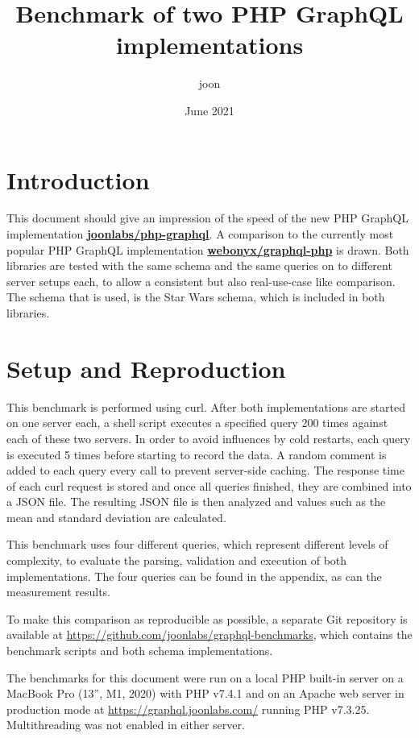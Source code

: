 \documentclass[11pt, a4paper]{article}
\title{Benchmark of two PHP GraphQL implementations }
\author{joon}
\date{June 2021}
\begin{document}
\maketitle

\section{Introduction}
This document should give an impression of the speed of the new PHP GraphQL implementation \textbf{\hyperlink{https://github.com/joonlabs/php-graphql}{joonlabs/php-graphql}}. A comparison to the currently most popular PHP GraphQL implementation \textbf{\hyperlink{https://github.com/webonyx/graphql-php}{webonyx/graphql-php}} is drawn. Both libraries are tested with the same schema and the same queries on to different server setups each, to allow a consistent but also real-use-case like comparison. The schema that is used, is the Star Wars schema, which is included in both libraries.

\section{Setup and Reproduction}
This benchmark is performed using curl. After both implementations are started on one server each, a shell script executes a specified query 200 times against each of these two servers. In order to avoid influences by cold restarts, each query is executed 5 times before starting to record the data. A random comment is added to each query every call to prevent server-side caching. The response time of each curl request is stored and once all queries finished, they are combined into a JSON file.  The resulting JSON file is then analyzed and values such as the mean and standard deviation are calculated.

This benchmark uses four different queries, which represent different levels of complexity, to evaluate the parsing, validation and execution of both implementations. The four queries can be found in the appendix, as can the measurement results. 

To make this comparison as reproducible as possible, a separate Git repository is available at \url{https://github.com/joonlabs/graphql-benchmarks}, which contains the benchmark scripts and both schema implementations.

The benchmarks for this document were run on a local PHP built-in server on a MacBook Pro (13'', M1, 2020) with PHP v7.4.1 and on an Apache web server in production mode at \hyperlink{https://graphql.joonlabs.com/}{https://graphql.joonlabs.com/} running PHP v7.3.25. Multithreading was not enabled in either server.
\end{document}
